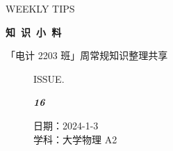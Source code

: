 \documentclass[UTF8]{ctexart}
\newcommand\Black[1]{\textcolor[gray]{0.3}{#1}}
\newcommand\Brown[1]{\textcolor[HTML]{998A4E}{#1}}
\newcommand\IssueNumber{16}
\newcommand\Date{2024-1-3}
\newcommand\Subject{大学物理 A2}
\begin{document}
\BgThispage
\begin{center}
{\scriptsize\Issue \textcolor[HTML]{C8BA83}{WEEKLY TIPS}}

{\Huge\bfseries\TitleFont \Black{知\ 识\ 小\ 料}}

\vspace{-0.1cm}
{\footnotesize \Brown{「电计 2203 班」周常规知识整理共享}}
\end{center}

\vspace{-0.5cm}

\begin{figure}[H]
\hspace{1cm}
\begin{minipage}[t]{0.3\textwidth}
\centering
    \Brown{ISSUE.}

    \vspace{-0.6cm}
    \Huge \Issue\slshape\bfseries\Black{\IssueNumber}
\end{minipage}
\hfill
\begin{minipage}[t]{0.35\textwidth}
\centering
    \Brown{日期：\Date} \\
\vspace{-0.1cm}
    \Brown{学科：\Subject} \\
\end{minipage}
\hspace{0.8cm}
\end{figure}
\end{document}
